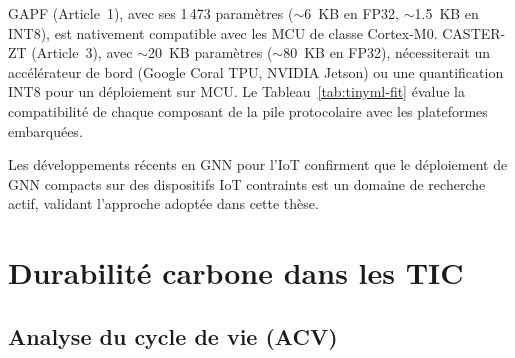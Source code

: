 GAPF (Article~1), avec ses 1\,473 paramètres ($\sim$6~KB en FP32, $\sim$1.5~KB en INT8), est nativement compatible avec les MCU de classe Cortex-M0. CASTER-ZT (Article~3), avec $\sim$20~KB paramètres ($\sim$80~KB en FP32), nécessiterait un accélérateur de bord (Google Coral TPU, NVIDIA Jetson) ou une quantification INT8 pour un déploiement sur MCU. Le Tableau~\ref{tab:tinyml-fit} évalue la compatibilité de chaque composant de la pile protocolaire avec les plateformes embarquées.

\begin{table}[htbp]
\centering
\caption{Compatibilité des composants de la pile protocolaire avec les plateformes embarquées. FP32~: virgule flottante 32 bits. INT8~: entier 8 bits quantifié.}
\label{tab:tinyml-fit}
\end{table}

Les développements récents en GNN pour l'IoT \cite{Nguyen2025GNNIoT} confirment que le déploiement de GNN compacts sur des dispositifs IoT contraints est un domaine de recherche actif, validant l'approche adoptée dans cette thèse.


\section{Durabilité carbone dans les TIC}\label{sec:revlit-carbon}

\subsection{Analyse du cycle de vie (ACV)}

